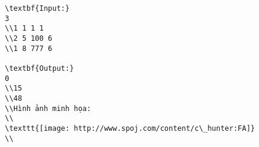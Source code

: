 \begin{verbatim}
\textbf{Input:}
3
\\1 1 1 1
\\2 5 100 6
\\1 8 777 6

\textbf{Output:}
0
\\15
\\48
\\Hình ảnh minh họa:
\\
\texttt{[image: http://www.spoj.com/content/c\_hunter:FA]} 
\\\end{verbatim}